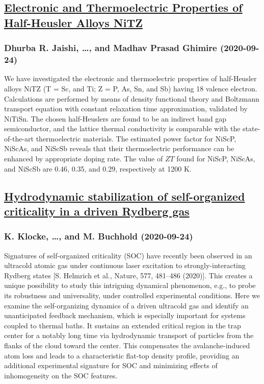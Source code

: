 \subsection*{\href{http://arxiv.org/abs/2009.11916v1}{Electronic and Thermoelectric Properties of Half-Heusler Alloys NiTZ}}
\subsubsection*{Dhurba R. Jaishi, \dots, and Madhav Prasad Ghimire (2020-09-24)}
We have investigated the electronic and thermoelectric properties of
half-Heusler alloys NiTZ (T = Sc, and Ti; Z = P, As, Sn, and Sb) having 18
valence electron. Calculations are performed by means of density functional
theory and Boltzmann transport equation with constant relaxation time
approximation, validated by NiTiSn. The chosen half-Heuslers are found to be an
indirect band gap semiconductor, and the lattice thermal conductivity is
comparable with the state-of-the-art thermoelectric materials. The estimated
power factor for NiScP, NiScAs, and NiScSb reveals that their thermoelectric
performance can be enhanced by appropriate doping rate. The value of $ZT$ found
for NiScP, NiScAs, and NiScSb are 0.46, 0.35, and 0.29, respectively at 1200 K.

\subsection*{\href{http://arxiv.org/abs/2009.11908v2}{Hydrodynamic stabilization of self-organized criticality in a driven  Rydberg gas}}
\subsubsection*{K. Klocke, \dots, and M. Buchhold (2020-09-24)}
Signatures of self-organized criticality (SOC) have recently been observed in
an ultracold atomic gas under continuous laser excitation to
strongly-interacting Rydberg states [S. Helmrich et al., Nature, 577, 481--486
(2020)]. This creates a unique possibility to study this intriguing dynamical
phenomenon, e.g., to probe its robustness and universality, under controlled
experimental conditions. Here we examine the self-organizing dynamics of a
driven ultracold gas and identify an unanticipated feedback mechanism, which is
especially important for systems coupled to thermal baths. It sustains an
extended critical region in the trap center for a notably long time via
hydrodynamic transport of particles from the flanks of the cloud toward the
center. This compensates the avalanche-induced atom loss and leads to a
characteristic flat-top density profile, providing an additional experimental
signature for SOC and minimizing effects of inhomogeneity on the SOC features.

